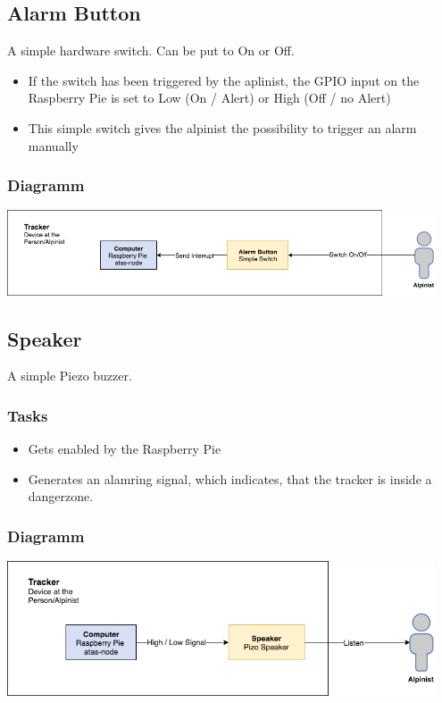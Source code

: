 \documentclass[a4paper,11pt, oneside]{report}
\theoremstyle{definition}
\begin{document}
\newpage
\subsection{Alarm Button}
A simple hardware switch. Can be put to On or Off.
\begin{itemize}
\item If the switch has been triggered by the aplinist, the GPIO input on the Raspberry Pie is set to Low (On / Alert) or High (Off / no Alert)
\item This simple switch gives the alpinist the possibility to trigger an alarm manually
\end{itemize}

\subsubsection{Diagramm}
\includegraphics[width=0.95\textwidth]{img/ATAS_SystemOverview_Detail_AlarmButton.png}

\subsection{Speaker}
A simple Piezo buzzer.
\subsubsection{Tasks}
\begin{itemize}
\item Gets enabled by the Raspberry Pie
\item Generates an alamring signal, which indicates, that the tracker is inside a dangerzone.
\end{itemize}

\subsubsection{Diagramm}
\includegraphics[width=0.95\textwidth]{img/ATAS_SystemOverview_Detail_Sound.png}
\end{document}
